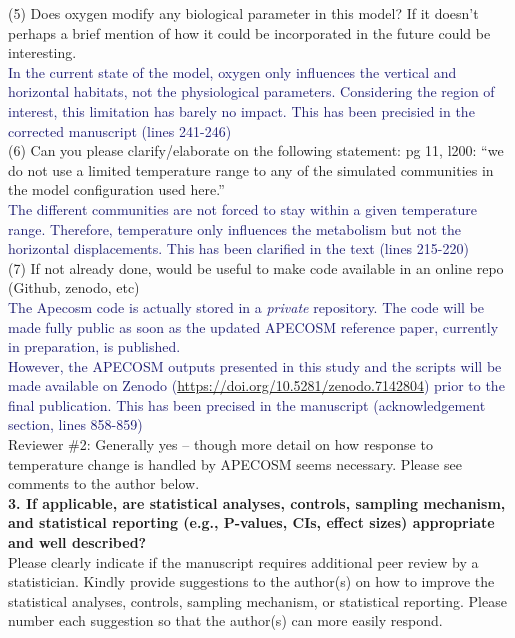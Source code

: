 \documentclass[12pt]{article}
\newcommand{\resp}[1]{\textcolor{MidnightBlue}{#1}}
\begin{document}
(5) Does oxygen modify any biological parameter in this model? If it doesn’t perhaps a brief mention of how it could be incorporated in the future could be interesting. \\ 

\resp{In the current state of the model, oxygen only influences the vertical and horizontal habitats, not the physiological parameters. Considering the region of interest, this limitation has barely no impact. This has been precisied in the corrected manuscript (lines 241-246)}\\

(6) Can you please clarify/elaborate on the following statement: pg 11, l200: “we do not use a limited temperature range to any of the simulated communities in the model configuration used here.” \\

\resp{The different communities are not forced to stay within a given temperature range. Therefore, temperature
only influences the metabolism but not the horizontal displacements. This has been clarified in the text (lines 215-220)} \\

(7) If not already done, would be useful to make code available in an online repo (Github, zenodo, etc) \\ 

\resp{The Apecosm code is actually stored in a \emph{private} repository. The code will be made fully public as soon as the updated APECOSM reference paper, currently in preparation, is published.} \\

\resp{However, the APECOSM outputs presented in this study and the scripts will be made available on Zenodo (\url{https://doi.org/10.5281/zenodo.7142804}) prior to the final publication. This has been precised in the manuscript (acknowledgement section, lines 858-859)} \\

Reviewer \#2: Generally yes -- though more detail on how response to temperature change is handled by APECOSM seems necessary. Please see comments to the author below. \\

\textbf{3. If applicable, are statistical analyses, controls, sampling mechanism, and statistical reporting (e.g., P-values, CIs, effect sizes) appropriate and well described?} \\

Please clearly indicate if the manuscript requires additional peer review by a statistician. Kindly provide suggestions to the author(s) on how to improve the statistical analyses, controls, sampling mechanism, or statistical reporting. Please number each suggestion so that the author(s) can more easily respond.\\
\end{document}
